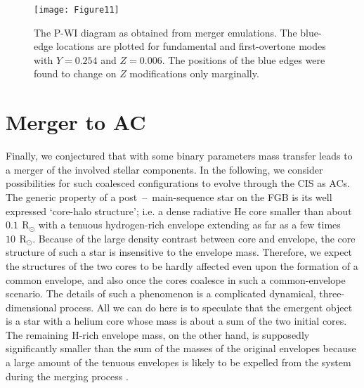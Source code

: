 \documentclass[a4paper,fleqn,usenatbib]{mnras}
\newcommand{\rsol}{~\mathrm{R}_\odot}
\begin{document}
\begin{figure}
	\texttt{[image: Figure11]}
    \caption{The P-WI diagram as obtained from merger emulations. The blue-edge locations
    	    are plotted for fundamental and first-overtone modes  
    	     with $Y=0.254$ and $Z=0.006$. 
    	     The positions of the blue edges were found to change on $Z$ modifications 
    	     only marginally.   
    	    }
    \label{fig:PWI_Mrgr}
\end{figure}


\section{Merger to AC}
Finally, we conjectured that with some binary parameters mass transfer leads 
to a merger of the  involved stellar components. 
In the following, we consider 
possibilities for such coalesced configurations to evolve through the CIS as ACs.
The generic property of a post~--~main-sequence star on the FGB is its well 
expressed `core-halo structure'; i.e. a dense radiative He core smaller than about $0.1\,\rsol$  
with a tenuous hydrogen-rich envelope extending as far as a few times $10\,\rsol$. 
Because of the large density contrast between core and envelope, the core structure of such a 
star is insensitive to the envelope mass.
Therefore, we expect the structures of the two cores to be hardly affected 
even upon the formation of a common envelope, and also once the cores coalesce 
in such a common-envelope scenario. The details of such a phenomenon is a complicated dynamical,
three-dimensional process. All we can do
here is to speculate that the emergent object is a star with a helium core whose mass is about 
a sum of the two initial cores. The remaining H-rich envelope mass, on the other hand, is 
supposedly significantly smaller than the sum of the masses of the original envelopes because 
a large amount of the tenuous envelopes is likely to be expelled from the system 
during the merging process \citep[e.g.][and references therein]{Ivanova2013}.
\end{document}
